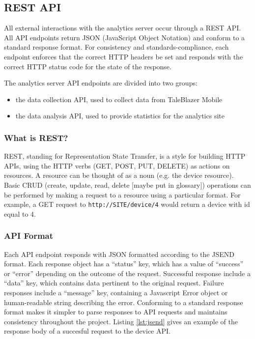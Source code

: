 \subsection{REST API}

All external interactions with the analytics server occur through a REST API. All API endpoints return JSON (JavaScript Object Notation) and conform to a standard response format. For consistency and standards-compliance, each endpoint enforces that the correct HTTP headers be set and responds with the correct HTTP status code for the state of the response.

The analytics server API endpoints are divided into two groups:
	\begin{itemize}
		\item the data collection API, used to collect data from TaleBlazer Mobile
		\item the data analysis API, used to provide statistics for the analytics site
	\end{itemize}


\subsubsection{What is REST?}
REST, standing for Representation State Transfer, is a style for building HTTP APIs, using the HTTP verbs (GET, POST, PUT, DELETE) as actions on resources. A resource can be thought of as a noun (e.g. the device resource). Basic CRUD (create, update, read, delete [maybe put in glossary]) operations can be performed by making a request to a resource using a particular format. For example, a GET request to \texttt{http://SITE/device/4} would return a device with id equal to 4. 

\subsubsection{API Format}

Each API endpoint responds with JSON formatted according to the JSEND format. \cite{site:jsend} Each response object has a ``status'' key, which has a value of ``success'' or ``error'' depending on the outcome of the request. Successful response include a ``data'' key, which contains data pertinent to the original request. Failure responses include a ``message'' key, containing a Javascript Error object or human-readable string describing the error. Conforming to a standard response format makes it simpler to parse responses to API requests and maintains consistency throughout the project. Listing \ref{lst:jsend} gives an example of the response body of a succesful request to the device API.


